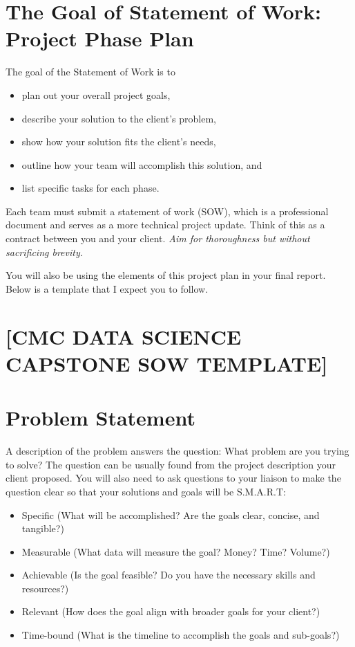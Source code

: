 \documentclass{article}
\begin{document}
\newpage
\section*{The Goal of Statement of Work: Project Phase Plan} 

The goal of the Statement of Work is to 
\begin{itemize}
\item plan out your overall project goals, 
\item describe your solution to the client's problem,
\item show how your solution fits the client's needs, 
\item outline how your team will accomplish this solution, and 
\item list specific tasks for each phase.
\end{itemize}

Each team must submit a statement of work (SOW), which is a professional document and serves as a more technical project update.
Think of this as a contract between you and your client. 
\textit{Aim for thoroughness but without sacrificing brevity. }

You will also be using the elements of this project plan in your final report. 
Below is a template that I expect you to follow.

\newpage

\section*{[CMC DATA SCIENCE CAPSTONE SOW TEMPLATE]}  %

%
\section{Problem Statement}
A description of the problem answers the question: What problem are you trying to solve? The question can be usually found from the project description your client proposed. You will also need to ask questions to your liaison to make the question clear so that your solutions and goals will be S.M.A.R.T: 

\begin{itemize}
    \item Specific (What will be accomplished? Are the goals clear, concise, and tangible?)
    \item Measurable (What data will measure the goal? Money? Time? Volume?)
    \item Achievable (Is the goal feasible? Do you have the necessary skills and resources?)
    \item Relevant (How does the goal align with broader goals for your client?)
    \item Time-bound (What is the timeline to accomplish the goals and sub-goals?)
\end{itemize}
\end{document}
